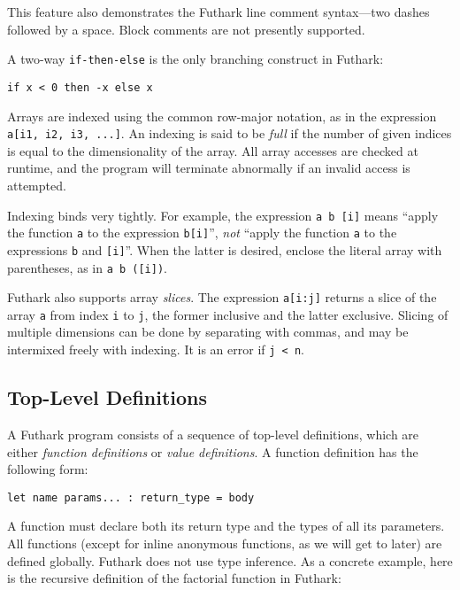 \documentclass[oneside,11pt]{book}
\begin{document}
\noindent
This feature also demonstrates the Futhark line comment syntax---two dashes
followed by a space.  Block comments are not presently supported.

A two-way \texttt{if-then-else} is the only branching construct in
Futhark:

\begin{lstlisting}
if x < 0 then -x else x
\end{lstlisting}

Arrays are indexed using the common row-major notation, as in the expression
\texttt{a[i1, i2, i3, ...]}.  An indexing is said to be \textit{full} if
the number of given indices is equal to the dimensionality of the
array.  All array accesses are checked at runtime, and the program
will terminate abnormally if an invalid access is attempted.

Indexing binds very tightly.  For example, the expression
\texttt{a~b~[i]} means ``apply the function \texttt{a} to the
expression \texttt{b[i]}'', \textit{not} ``apply the function
\texttt{a} to the expressions \texttt{b} and \texttt{[i]}''.  When the
latter is desired, enclose the literal array with parentheses, as in
\texttt{a~b~([i])}.

Futhark also supports array \textit{slices}.  The expression
\texttt{a[i:j]} returns a slice of the array \texttt{a} from index
\texttt{i} to \texttt{j}, the former inclusive and the latter
exclusive.  Slicing of multiple dimensions can be done by separating
with commas, and may be intermixed freely with indexing.  It is an
error if \texttt{j < n}.

\subsection{Top-Level Definitions}
\label{sec:function-declarations}

A Futhark program consists of a sequence of top-level definitions,
which are either \textit{function definitions} or \textit{value
  definitions}.  A function definition has the following form:

\begin{lstlisting}
let name params... : return_type = body
\end{lstlisting}

\noindent
A function must declare both its return type and the types of all its
parameters.  All functions (except for inline anonymous functions, as
we will get to later) are defined globally.  Futhark does not use type
inference.  As a concrete example, here is the recursive definition of
the factorial function in Futhark:
\end{document}
